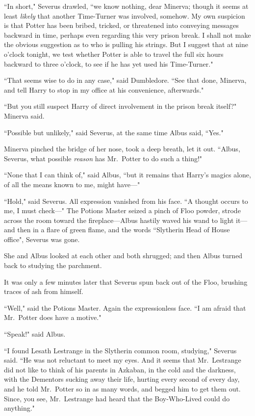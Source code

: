 ``In short," Severus drawled, ``we know nothing, dear Minerva; though it seems at least \emph{likely} that another Time-Turner was involved, somehow. My own suspicion is that Potter has been bribed, tricked, or threatened into conveying messages backward in time, perhaps even regarding this very prison break. I shall not make the obvious suggestion as to who is pulling his strings. But I suggest that at nine o'clock tonight, we test whether Potter is able to travel the full six hours backward to three o'clock, to see if he has yet used his Time-Turner."

``That seems wise to do in any case," said Dumbledore. ``See that done, Minerva, and tell Harry to stop in my office at his convenience, afterwards."

``But you still suspect Harry of direct involvement in the prison break itself?" Minerva said.

``Possible but unlikely," said Severus, at the same time Albus said, ``Yes."

Minerva pinched the bridge of her nose, took a deep breath, let it out. ``Albus, Severus, what possible \emph{reason} has Mr.~Potter to do such a thing!"

``None that I can think of," said Albus, ``but it remains that Harry's magics alone, of all the means known to me, might have---"

``Hold," said Severus. All expression vanished from his face. ``A thought occurs to me, I must check---" The Potions Master seized a pinch of Floo powder, strode across the room toward the fireplace---Albus hastily waved his wand to light it---and then in a flare of green flame, and the words ``Slytherin Head of House office", Severus was gone.

She and Albus looked at each other and both shrugged; and then Albus turned back to studying the parchment.

It was only a few minutes later that Severus spun back out of the Floo, brushing traces of ash from himself.

``Well," said the Potions Master. Again the expressionless face. ``I am afraid that Mr.~Potter does have a motive."

``Speak!" said Albus.

``I found Lesath Lestrange in the Slytherin common room, studying," Severus said. ``He was not reluctant to meet my eyes. And it seems that Mr.~Lestrange did not like to think of his parents in Azkaban, in the cold and the darkness, with the Dementors sucking away their life, hurting every second of every day, and he told Mr.~Potter so in as many words, and begged him to get them out. Since, you see, Mr.~Lestrange had heard that the Boy-Who-Lived could do anything."

